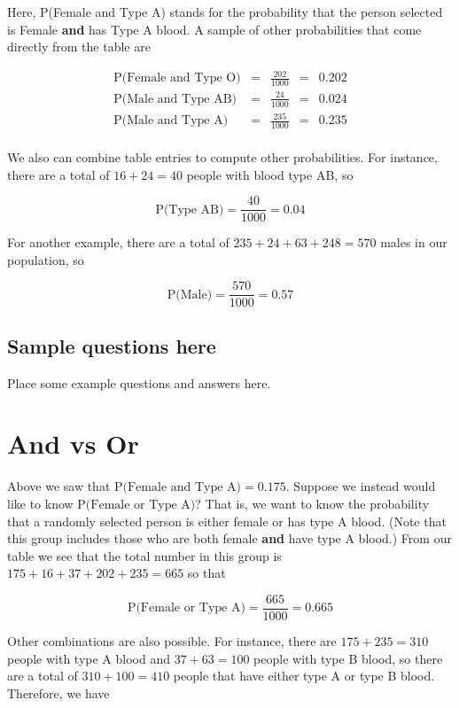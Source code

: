 \documentclass[
]{book}
\begin{document}
Here, P(Female and Type A) stands for the probability that the person selected is Female \textbf{and} has Type A blood.
A sample of other probabilities that come directly from the table are

\[\begin{array}{rcccl}
\mbox{P(Female and Type O)} & = & {\displaystyle\frac{202}{1000}} & = & 0.202 \\[5pt]
\mbox{P(Male and Type AB)} & = & {\displaystyle\frac{24}{1000}} & = & 0.024 \\[5pt]
\mbox{P(Male and Type A)} & = & {\displaystyle\frac{235}{1000}} & = & 0.235 \\
\end{array}\]

We also can combine table entries to compute other probabilities.
For instance, there are a total of \(16 + 24 = 40\) people with blood type AB, so

\[
\mbox{P(Type AB)} = \frac{40}{1000} = 0.04
\]

For another example, there are a total of \(235 + 24 + 63 + 248 = 570\) males in our population, so

\[
\mbox{P(Male)} = \frac{570}{1000} = 0.57
\]

\hypertarget{sample-questions-here}{%
\subsection{Sample questions here}\label{sample-questions-here}}

Place some example questions and answers here.

\hypertarget{and-vs-or-1}{%
\section{And vs Or}\label{and-vs-or-1}}

Above we saw that \(\mbox{P(Female and Type A)} = 0.175\). Suppose we instead would like to know \(\mbox{P(Female or Type A)}\)?
That is, we want to know the probability that a randomly selected person is either female or has type A blood.
(Note that this group includes those who are both female \textbf{and} have type A blood.)
From our table we see that the total number in this group is \(175 + 16 + 37 + 202 + 235 = 665\) so that

\[
\mbox{P(Female or Type A)} = \frac{665}{1000} = 0.665
\]

Other combinations are also possible.
For instance, there are \(175 + 235 = 310\) people with type A blood and \(37 + 63 = 100\) people with type B blood,
so there are a total of \(310 + 100 = 410\) people that have either type A or type B blood.
Therefore, we have
\end{document}

